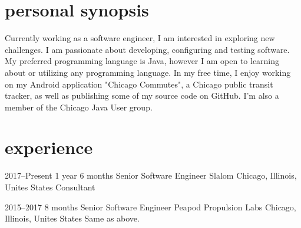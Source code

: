 \documentclass[]{friggeri-cv} %
\begin{document}
\section{personal synopsis}

Currently working as a software engineer, I am interested in exploring new challenges. I am passionate about developing, configuring and testing software. My preferred programming language is Java, however I am open to learning about or utilizing any programming language. In my free time, I enjoy working on my Android application "Chicago Commutes", a Chicago public transit tracker, as well as publishing some of my source code on GitHub. I'm also a member of the Chicago Java User group.



\section{experience}

\begin{entrylist}

\entry
{2017--Present}
{1 year 6 months}
{Senior Software Engineer} 
{Slalom}
{Chicago, Illinois, Unites States}
{Consultant}
\vspace{-7mm}

\end{entrylist}


\begin{entrylist}

\entry
{2015--2017}
{8 months}
{Senior Software Engineer} 
{Peapod Propulsion Labs}
{Chicago, Illinois, Unites States}
{Same as above.
}
\vspace{-7mm}

\end{entrylist}

\end{document}
